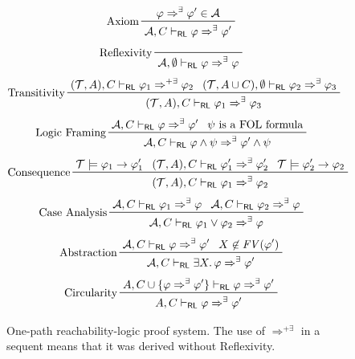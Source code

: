 \begin{figure}
    \centering
    \begin{align*}
        & \prftree[l]{Axiom}
          { \varphi \Rightarrow^{\exists} \varphi^\prime \in \mathcal{A} }
          { \mathcal{A}, C \vdash_\RL \varphi \Rightarrow^{\exists} \varphi^\prime }
    \end{align*}
    \begin{align*}
        & \prftree[l]{Reflexivity}
          { \mathcal{A}, \emptyset \vdash_\RL \varphi \Rightarrow^{\exists} \varphi }
    \end{align*}
    \begin{align*}
        & \prftree[l]{Transitivity}
          { (\mathcal{T}, A), C \vdash_\RL \varphi_1 \Rightarrow^{+ \exists} \varphi_2 }
          { (\mathcal{T}, A \cup C), \emptyset \vdash_\RL \varphi_2 \Rightarrow^{\exists} \varphi_3 }
          { (\mathcal{T}, A), C \vdash_\RL \varphi_1 \Rightarrow^{\exists} \varphi_3 }
    \end{align*}
    \begin{align*}
        & \prftree[l]{Logic Framing}
          { \mathcal{A}, C \vdash_\RL \varphi \Rightarrow^{\exists} \varphi^\prime }
          { \psi \mbox{ is a FOL formula} }
          { \mathcal{A}, C \vdash_\RL \varphi \land \psi \Rightarrow^{\exists} \varphi^\prime \land \psi }
    \end{align*}
    \begin{align*}
        & \prftree[l]{Consequence}
          { \mathcal{T} \modelsML \varphi_1 \rightarrow \varphi_1^\prime }
          { (\mathcal{T}, A), C \vdash_\RL \varphi_1^\prime \Rightarrow^{\exists} \varphi_2^\prime }
          { \mathcal{T} \modelsML \varphi_2^\prime \rightarrow \varphi_2 }
          { (\mathcal{T}, A), C \vdash_\RL \varphi_1 \Rightarrow^{\exists} \varphi_2 }
    \end{align*}
    \begin{align*}
        & \prftree[l]{Case Analysis}
          { \mathcal{A}, C \vdash_\RL \varphi_1 \Rightarrow^{\exists} \varphi }
          { \mathcal{A}, C \vdash_\RL \varphi_2 \Rightarrow^{\exists} \varphi }
          { \mathcal{A}, C \vdash_\RL \varphi_1 \lor \varphi_2 \Rightarrow^{\exists} \varphi }
    \end{align*}
    \begin{align*}
        & \prftree[l]{Abstraction}
          { \mathcal{A}, C \vdash_\RL \varphi \Rightarrow^{\exists} \varphi^\prime }
          { X \not\in \mathit{FV}(\varphi^\prime) }
          { \mathcal{A}, C \vdash_\RL \exists X.\, \varphi \Rightarrow^{\exists} \varphi^\prime }
    \end{align*}
    \begin{align*}
        & \prftree[l]{Circularity}
          { A, C \cup \{ \varphi\Rightarrow^\exists \varphi^\prime \} \vdash_\RL \varphi \Rightarrow^\exists \varphi^\prime }
          { A, C \vdash_\RL \varphi \Rightarrow^\exists \varphi^\prime }
    \end{align*}

    \caption{One-path reachability-logic proof system.
    The use of $\Rightarrow^{+ \exists}$ in a sequent means that it was derived without Reflexivity.}
    \label{fig:RLproofsystem}
\end{figure}

